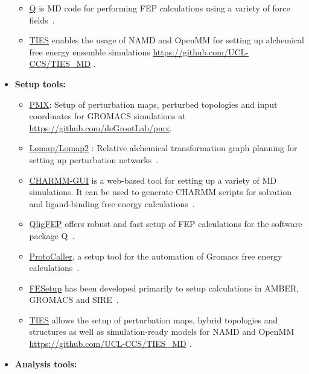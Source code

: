 \documentclass[9pt,bestpractices]{livecoms}
\begin{document}
\begin{itemize}
\begin{itemize}
	\item \href{https://github.com/qusers/Q6}{Q} is MD code for performing FEP calculations using a variety of force fields~\cite{aaquist2017q6}. 
    \item \href{http://www.ties-service.org}{TIES} enables the usage of NAMD and OpenMM for setting up alchemical free energy ensemble simulations \url{https://github.com/UCL-CCS/TIES_MD} \cite{bieniek2023}.
	\end{itemize}
\item[] \textbf{Setup tools:}
	\begin{itemize}
	\item \href{http://pmx.mpibpc.mpg.de/instructions.html}{PMX}: Setup of perturbation maps, perturbed topologies and input coordinates for GROMACS simulations at \url{https://github.com/deGrootLab/pmx}.
	\item \href{https://github.com/MobleyLab/Lomap}{Lomap/Lomap2} : Relative alchemical transformation graph planning for setting up perturbation networks~\cite{liu2013lead}.
	\item \href{http://www.charmm-gui.org/}{CHARMM-GUI} is a web-based tool for setting up a variety of MD simulations. It can be used to generate CHARMM scripts for solvation and ligand-binding free energy calculations~\cite{jo2008charmmgui}.
	\item \href{https://github.com/qusers/qligfep}{QligFEP} offers robust and fast setup of FEP calculations for the software package Q~\cite{jespers2019qligfep}.
	\item \href{https://github.com/protocaller/ProtoCaller}{ProtoCaller}, a setup tool for the automation of Gromacs free energy calculations~\cite{suruzhon2020protocaller}.
	\item \href{https://fesetup.readthedocs.io/en/latest/introduction.html}{FESetup} has been developed primarily to setup calculations in AMBER, GROMACS and SIRE~\cite{loeffler2015fesetup}.
    \item \href{http://www.ties-service.org}{TIES} allows the setup of perturbation maps, hybrid topologies and structures as well as simulation-ready models for NAMD and OpenMM \url{https://github.com/UCL-CCS/TIES_MD} \cite{bieniek2023}.
	\end{itemize}
\item []\textbf{Analysis tools:}
	\begin{itemize}


\end{itemize}
\end{itemize}
\end{document}
